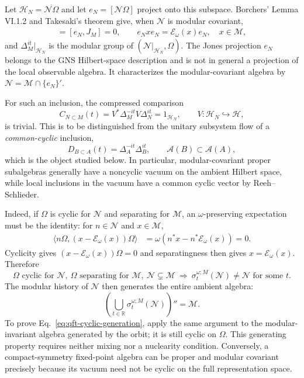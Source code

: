 \documentclass[a4paper,11pt]{article}
\theoremstyle{definition}
\begin{document}
Let $\mathcal H_N=\overline{\mathcal N\Omega}$ and let
$e_N=[\mathcal N\Omega]$ project onto this subspace. Borchers'
Lemma VI.1.2 and Takesaki's theorem give, when $\mathcal N$ is modular
covariant,
\begin{align}
 [e_N,\Delta_M^{it}]=[e_N,J_M]=0,
 \qquad
 e_Nxe_N=\mathcal E_\omega(x)e_N,
 \quad x\in\mathcal M,
 \label{eq:qft-Jones-compression}
\end{align}
and $\Delta_M^{it}|_{\mathcal H_N}$ is the modular group of
$(\mathcal N|_{\mathcal H_N},\Omega)$. The Jones projection $e_N$
belongs to the GNS Hilbert-space description and is not in general a
projection of the local observable algebra. It characterizes the
modular-covariant algebra by
$\mathcal N=\mathcal M\cap\{e_N\}'$.

For such an inclusion, the compressed comparison
\begin{equation}
 C_{N\subset M}(t)
  =V^*\Delta_M^{-it}V\Delta_N^{it}=1_{\mathcal H_N},
 \qquad V:\mathcal H_N\hookrightarrow\mathcal H,
 \label{eq:qft-compressed-autonomy}
\end{equation}
is trivial. This is to be distinguished from the unitary subsystem
flow of a \emph{common-cyclic} inclusion,
\begin{equation}
 D_{B\subset A}(t)=\Delta_A^{-it}\Delta_B^{it},
 \qquad \mathcal A(B)\subset\mathcal A(A),
 \label{eq:qft-comparison-reminder}
\end{equation}
which is the object studied below. In particular, modular-covariant
proper subalgebras generally have a noncyclic vacuum on the ambient
Hilbert space, while local inclusions in the vacuum have a common cyclic
vector by Reeh--Schlieder.

Indeed, if $\Omega$ is cyclic for $\mathcal N$ and separating for
$\mathcal M$, an $\omega$-preserving expectation must be the identity:
for $n\in\mathcal N$ and $x\in\mathcal M$,
\begin{align}
 \langle n\Omega,(x-\mathcal E_\omega(x))\Omega\rangle
 &=\omega\!\left(n^*x-n^*\mathcal E_\omega(x)\right)=0 .
\end{align}
Cyclicity gives $(x-\mathcal E_\omega(x))\Omega=0$ and separatingness
then gives $x=\mathcal E_\omega(x)$. Therefore
\begin{equation}
\ \Omega\text{ cyclic for }\mathcal N,
 \ \Omega\text{ separating for }\mathcal M,
 \ \mathcal N\subsetneq\mathcal M
 \ \Longrightarrow\
 \sigma_t^{\omega;M}(\mathcal N)\neq\mathcal N
 \text{ for some }t.\ 
 \label{eq:qft-cyclic-no-go}
\end{equation}
The modular history of $\mathcal N$ then generates the entire ambient
algebra:
\begin{equation}
 \left(\bigcup_{t\in\mathbb R}\sigma_t^{\omega;M}(\mathcal N)
 \right)''=\mathcal M.
 \label{eq:qft-cyclic-generation}
\end{equation}
To prove Eq.~\eqref{eq:qft-cyclic-generation}, apply the same argument
to the modular-invariant algebra generated by the orbit; it is still
cyclic on $\Omega$. This generating property requires neither mixing
nor a nuclearity condition. Conversely, a compact-symmetry fixed-point
algebra can be proper and modular covariant precisely because its
vacuum need not be cyclic on the full representation space.
\end{document}
